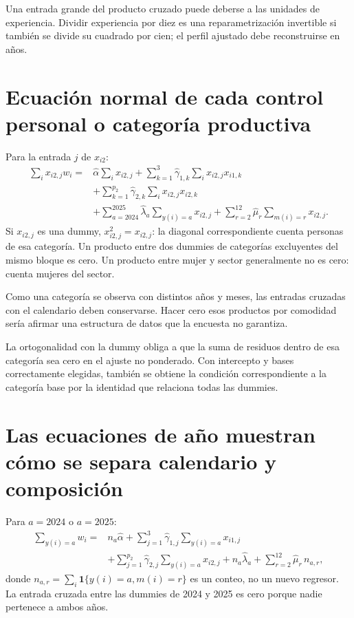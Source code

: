 \documentclass[11pt,a4paper]{article}
\begin{document}
Una entrada grande del producto cruzado puede deberse a las unidades de experiencia. Dividir experiencia por diez es una reparametrización invertible si también se divide su cuadrado por cien; el perfil ajustado debe reconstruirse en años.

\clearpage
\section{Ecuación normal de cada control personal o categoría productiva}

Para la entrada $j$ de $x_{i2}$:
\[
\begin{aligned}
\sum_ix_{i2,j}w_i={}&
\widehat\alpha\sum_ix_{i2,j}
+\sum_{k=1}^{3}\widehat\gamma_{1,k}\sum_ix_{i2,j}x_{i1,k}\\
&+\sum_{k=1}^{p_2}\widehat\gamma_{2,k}\sum_ix_{i2,j}x_{i2,k}\\
&+\sum_{a=2024}^{2025}\widehat\lambda_a
\sum_{y(i)=a}x_{i2,j}
+\sum_{r=2}^{12}\widehat\mu_r\sum_{m(i)=r}x_{i2,j}.
\end{aligned}
\]
Si $x_{i2,j}$ es una dummy, $x_{i2,j}^2=x_{i2,j}$: la diagonal correspondiente cuenta personas de esa categoría. Un producto entre dos dummies de categorías excluyentes del mismo bloque es cero. Un producto entre mujer y sector generalmente no es cero: cuenta mujeres del sector.

Como una categoría se observa con distintos años y meses, las entradas cruzadas con el calendario deben conservarse. Hacer cero esos productos por comodidad sería afirmar una estructura de datos que la encuesta no garantiza.

La ortogonalidad con la dummy obliga a que la suma de residuos dentro de esa categoría sea cero en el ajuste no ponderado. Con intercepto y bases correctamente elegidas, también se obtiene la condición correspondiente a la categoría base por la identidad que relaciona todas las dummies.

\clearpage
\section{Las ecuaciones de año muestran cómo se separa calendario y composición}

Para $a=2024$ o $a=2025$:
\[
\begin{aligned}
\sum_{y(i)=a}w_i={}&n_a\widehat\alpha
+\sum_{j=1}^3\widehat\gamma_{1,j}\sum_{y(i)=a}x_{i1,j}\\
&+\sum_{j=1}^{p_2}\widehat\gamma_{2,j}\sum_{y(i)=a}x_{i2,j}
+n_a\widehat\lambda_a
+\sum_{r=2}^{12}\widehat\mu_r\,n_{a,r},
\end{aligned}
\]
donde $n_{a,r}=\sum_i\mathbf1\{y(i)=a,m(i)=r\}$ es un conteo, no un nuevo regresor. La entrada cruzada entre las dummies de 2024 y 2025 es cero porque nadie pertenece a ambos años.
\end{document}
